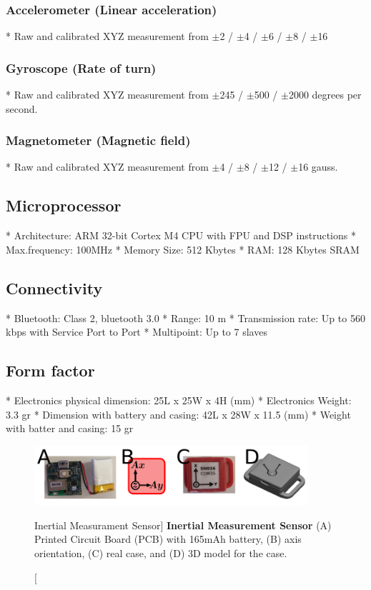 \subsubsection*{Accelerometer (Linear acceleration)}
* Raw and calibrated XYZ measurement from 
$\pm$2 / $\pm$4 / $\pm$6 / $\pm$8  / $\pm$16

\subsubsection*{Gyroscope (Rate of turn)}
* Raw and calibrated XYZ measurement from 
$\pm$245 /  $\pm$500 / $\pm$2000 degrees per second.

\subsubsection*{Magnetometer (Magnetic field)}
* Raw and calibrated XYZ measurement from 
$\pm$4 / $\pm$8 / $\pm$12 / $\pm$16 gauss.


\subsection*{Microprocessor}
* Architecture: ARM 32-bit Cortex M4 CPU with FPU and DSP instructions
* Max.frequency: 100MHz
* Memory Size: 512 Kbytes
* RAM: 128 Kbytes SRAM


\subsection*{Connectivity}
* Bluetooth: Class 2, bluetooth 3.0
* Range: 10 m
* Transmission rate: Up to 560 kbps with Service Port to Port
* Multipoint: Up to 7 slaves


\subsection*{Form factor}
* Electronics physical dimension: 25L x 25W x 4H (mm)
* Electronics Weight: 3.3 gr
* Dimension with battery and casing: 42L x 28W x 11.5 (mm)
* Weight with batter and casing: 15 gr


\begin{figure}
 \centering
   \includegraphics[width=0.9\textwidth]{muse}
   \caption
	[Inertial Measurament Sensor]{
	{\bf Inertial Measurement Sensor}
		(A) Printed Circuit Board (PCB) with 165mAh battery,
		(B) axis orientation, 
		(C) real case, and 
		(D) 3D model for the case.
}
   \label{fig:muse}
\end{figure}

